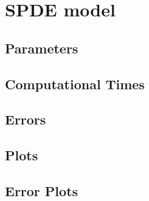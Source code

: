 \section{SPDE model}
	
\subsection{Parameters}
	
\subsection{Computational Times}
	
\subsection{Errors}
	
\subsection{Plots}
	
\subsection{Error Plots}
	
